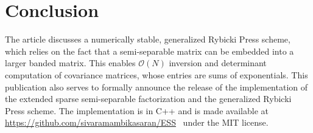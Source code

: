 \documentclass[final,leqno]{siamltex}
\begin{document}
\section{Conclusion}
The article discusses a numerically stable, generalized Rybicki Press scheme, which relies on the fact that a semi-separable matrix can be embedded into a larger banded matrix. This enables $\mathcal{O}(N)$ inversion and determinant computation of covariance matrices, whose entries are sums of exponentials. This publication also serves to formally announce the release of the implementation of the extended sparse semi-separable factorization and the generalized Rybicki Press scheme. The implementation is in C++ and is made available at \url{https://github.com/sivaramambikasaran/ESS}~\cite{ambikasaran2014ESS} under the MIT license.

\FloatBarrier


\newpage


\end{document}
